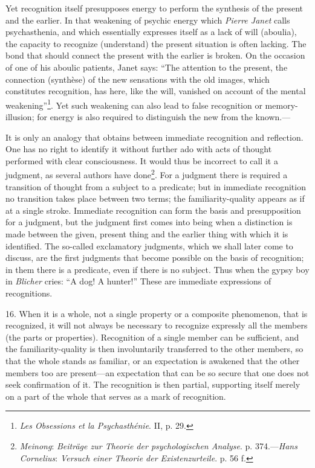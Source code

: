\documentclass[12pt,a4paper]{book}
\newcommand{\opage}[1]{\marginnote{\footnotesize\textit{[#1]}}}
\begin{document}
Yet recognition itself presupposes energy to perform the synthesis of the
present and the earlier. In that weakening of psychic energy which
\emph{Pierre Janet} calls psychasthenia, and which essentially expresses
itself as a lack of will (aboulia), the capacity to recognize
(understand) the present situation is often lacking. The bond that should
connect the present with the earlier is broken. On the occasion of one of
his aboulic patients, Janet says: ``The attention to the present, the
connection (synthèse) of the new sensations with the old images, which
constitutes recognition, has here, like the will, vanished on account of
the mental weakening''\footnote{\emph{Les Obsessions et la
Psychasthénie}. II, p. 29.}. Yet such weakening can also lead to false
recognition or memory-illusion; for energy is also required to
distinguish the new from the known.---

It is only an analogy that obtains between immediate \opage{50}recognition and
reflection. One has no right to identify it without further ado with acts
of thought performed with clear consciousness. It would thus be incorrect
to call it a judgment, as several authors have
done\footnote{\emph{Meinong}: \emph{Beiträge zur Theorie der
psychologischen Analyse}. p. 374.---\emph{Hans Cornelius}: \emph{Versuch
einer Theorie der Existenzurteile}. p. 56 f.}. For a judgment there is
required a transition of thought from a subject to a predicate; but in
immediate recognition no transition takes place between two terms; the
familiarity-quality appears as if at a single stroke. Immediate
recognition can form the basis and presupposition for a judgment, but the
judgment first comes into being when a distinction is made between the
given, present thing and the earlier thing with which it is identified.
The so-called exclamatory judgments, which we shall later come to
discuss, are the first judgments that become possible on the basis of
recognition; in them there is a predicate, even if there is no subject.
Thus when the gypsy boy in \emph{Blicher} cries: ``A dog! A hunter!''
These are immediate expressions of recognitions.

16. When it is a whole, not a single property or a composite phenomenon,
that is recognized, it will not always be necessary to recognize
expressly all the members (the parts or properties). Recognition of a
single member can be sufficient, and the familiarity-quality is then
involuntarily transferred to the other members, so that the whole stands
as familiar, or an expectation is awakened that the other members too are
present---an expectation that can be so secure that one does not seek
confirmation of it. The recognition is then partial, supporting itself
merely on a part of the whole that serves as a mark of recognition.
\end{document}
